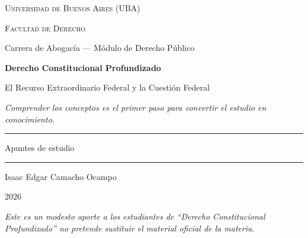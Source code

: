 \documentclass[12pt,oneside]{book}
\newcommand{\universidad}{Universidad de Buenos Aires (UBA)}
\newcommand{\facultad}{Facultad de Derecho}
\newcommand{\carrera}{Carrera de Abogacía --- Módulo de Derecho Público}
\newcommand{\materia}{Derecho Constitucional Profundizado}
\newcommand{\titulo}{El Recurso Extraordinario Federal y la Cuestión Federal}
\newcommand{\autor}{Isaac Edgar Camacho Ocampo}
\newcommand{\anio}{2026}
\begin{document}
\begin{titlepage}

\thispagestyle{empty}

\begin{center}

\vspace*{1cm}

{\large \textsc{\universidad}}

\vspace{0.2cm}

{\large \textsc{\facultad}}

\vspace{0.2cm}

{\large \carrera}

\vspace{3cm}

{\Huge \textbf{\materia}}

\vspace{1cm}

{\LARGE \titulo}

\vspace{0.8cm}

\textit{Comprender los conceptos es el primer paso para convertir el estudio en conocimiento.}

\vspace{1.2cm}

\rule{0.70\textwidth}{0.5pt}

\vspace{0.5cm}

{\large Apuntes de estudio}

\vspace{0.5cm}

\rule{0.70\textwidth}{0.5pt}

\vfill

{\large \autor}

\vspace{0.3cm}

{\large \anio}

\end{center}

\vfill

\begin{flushleft}
\textit{Este es un modesto aporte a los estudiantes de ``Derecho Constitucional Profundizado'' no pretende sustituir el material oficial de la materia.}
\end{flushleft}

\end{titlepage}
\end{document}
